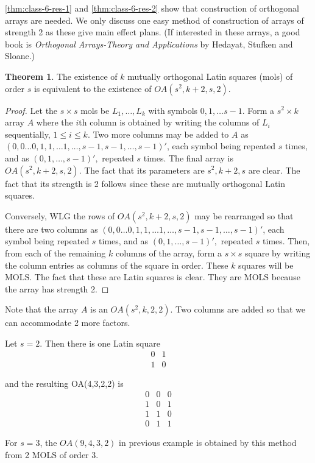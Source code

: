 \documentclass[12pt]{article}
\theoremstyle{definition}
\newtheorem{thm}{Theorem}
\newenvironment{theorem}{
\begin{tcolorbox}[colback=green!5!white,colframe=green!75!black, parbox = false]\begin{thm} }{\end{thm}\end{tcolorbox} }
\newenvironment{example}[1][\unskip]{
\begin{tcolorbox}[colback=blue!5!white,colframe=blue!75!black, title = {Example #1}, parbox = false] }{\end{tcolorbox} }
\begin{document}
\cref{thm:class-6-res-1} and \cref{thm:class-6-res-2} show that construction of orthogonal arrays are needed.  We only discuss one easy method of construction of arrays of strength 2 as these give main effect plans. (If interested in these arrays, a good book is \textit{Orthogonal Arrays-Theory and Applications} by Hedayat, Stufken and Sloane.)
 
\begin{theorem}
    \label{thm:class-6-res-3}
    The existence of $k$ mutually orthogonal Latin squares (mols) of order $s$  is equivalent to the existence of $OA(s^2, k+2, s,2).$
\end{theorem}

\begin{proof}
     Let the $s\times s$ mols be $L_1, \ldots, L_k$ with symbols $0, 1, \ldots s-1.$ Form a $s^2\times k$ array $A$ where the $i$th column is obtained by writing the columns of $L_i$ sequentially, $1\leq i\leq k$. Two more columns may be added to $A$ as $(0, 0\ldots 0, 1,1,\ldots 1, \ldots, s-1,s-1,\ldots,s-1)'$, each symbol being repeated $s$ times, and as $(0,1,\ldots,s-1)', $ repeated $s$ times. The final array is $OA(s^2,k+2,s,2).$ The fact that its parameters are $s^2, k+2,s$ are clear. The fact that its strength is 2 follows since these are mutually orthogonal Latin squares.
     
     Conversely, WLG the rows of $OA(s^2,k+2,s,2)$  may be rearranged so that there are two columns as $(0, 0\ldots 0, 1,1,\ldots 1, \ldots, s-1,s-1,\ldots,s-1)'$, each symbol being repeated $s$ times, and as $(0,1,\ldots,s-1)', $ repeated $s$ times. Then, from each of the remaining $k$ columns of the array, form a $s\times s$ square by writing the column entries as columns of the square in order.  These $k$ squares will be MOLS. The fact that these are Latin squares is clear. They are MOLS because the array has strength 2.
\end{proof}

Note that the array $A$ is an $OA(s^2,k,2,2)$. Two columns are added so that we can accommodate 2 more factors. 

\begin{example}
     Let $s=2.$ Then there is one Latin square 
     $$\begin{array}{cc}
    0&1 \\ 1 & 0
    \end{array}$$ 
    
    and the resulting OA(4,3,2,2) is 
    $$\begin{array}{ccc}
    0 & 0 & 0\\ 1& 0 & 1\\ 1 & 1 & 0\\ 0& 1 &1
    \end{array}$$
    
    For $s=3$, the $OA(9,4,3,2)$ in previous example is obtained by this method from 2 MOLS of order 3.
\end{example}


	
\end{document}
